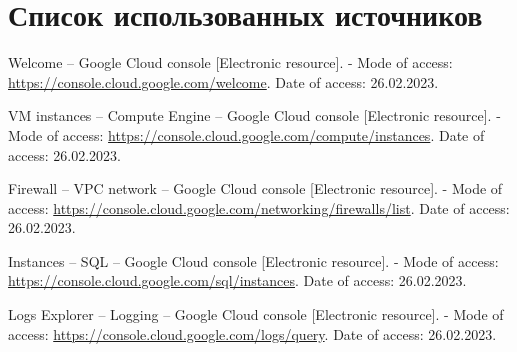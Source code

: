 \documentclass[12pt, a4paper, simple]{eskdtext}
\begin{document}
  \newpage
  \begingroup
    \section*{Список использованных источников} %

    \renewcommand{\addcontentsline}[3]{}%
    \renewcommand{\section}[2]{}%

    \begin{thebibliography}{}

    Welcome – Google Cloud console
    [Electronic resource]. -
    Mode of access:
    \url{https://console.cloud.google.com/welcome}.
    Date of access: 26.02.2023.

    VM instances – Compute Engine – Google Cloud console
    [Electronic resource]. -
    Mode of access:
    \url{https://console.cloud.google.com/compute/instances}.
    Date of access: 26.02.2023.

    Firewall – VPC network – Google Cloud console
    [Electronic resource]. -
    Mode of access:
    \url{https://console.cloud.google.com/networking/firewalls/list}.
    Date of access: 26.02.2023.

    Instances – SQL – Google Cloud console
    [Electronic resource]. -
    Mode of access:
    \url{https://console.cloud.google.com/sql/instances}.
    Date of access: 26.02.2023.

    Logs Explorer – Logging – Google Cloud console
    [Electronic resource]. -
    Mode of access:
    \url{https://console.cloud.google.com/logs/query}.
    Date of access: 26.02.2023.

  \end{thebibliography}
  \endgroup
\end{document}
